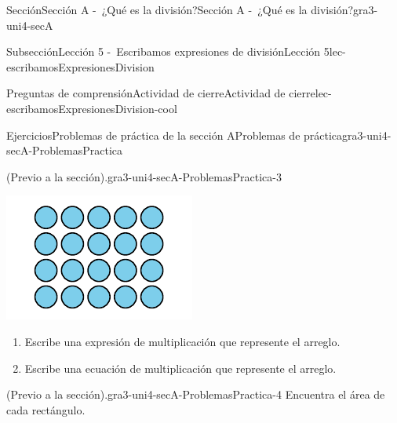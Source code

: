 \documentclass[twoside,10pt,]{article}
\begin{document}
\begin{sectionptx}{Sección}{Sección A -~¿Qué es la división?}{}{Sección A -~¿Qué es la división?}{}{}{gra3-uni4-secA}
\begin{subsectionptx}{Subsección}{Lección 5 -~Escribamos expresiones de división}{}{Lección 5}{}{}{lec-escribamosExpresionesDivision}
\begin{reading-questions-subsubsection}{Preguntas de comprensión}{Actividad de cierre}{}{Actividad de cierre}{}{}{lec-escribamosExpresionesDivision-cool}
\end{reading-questions-subsubsection}
\end{subsectionptx}
%
%
\typeout{************************************************}
\typeout{************************************************}
%
\begin{exercises-subsection}{Ejercicios}{Problemas de práctica de la sección A}{}{Problemas de práctica}{}{}{gra3-uni4-secA-ProblemasPractica}
\begin{divisionexercise}{1}{(Previo a la sección).}{}{gra3-uni4-secA-ProblemasPractica-3}%
\begin{sidebyside}{2}{0}{0}{0}%
\begin{sbspanel}{0.3}%
\includegraphics[width=\linewidth]{external/svg-source/tikz-file-151668.pdf}
\end{sbspanel}%
\begin{sbspanel}{0.7}%
%
\begin{enumerate}[label={(\alph*)}]
\item{}Escribe una expresión de multiplicación que represente el arreglo.%
\item{}Escribe una ecuación de multiplicación que represente el arreglo.%
\end{enumerate}
%
\end{sbspanel}%
\end{sidebyside}%
\end{divisionexercise}%
\begin{divisionexercise}{2}{(Previo a la sección).}{}{gra3-uni4-secA-ProblemasPractica-4}%
Encuentra el área de cada rectángulo.%
\begin{sidebyside}{2}{0.05}{0.05}{0.1}%
\begin{sbspanel}{0.3}%

\end{sbspanel}
\end{sidebyside}
\end{divisionexercise}
\end{exercises-subsection}
\end{sectionptx}
\end{document}
